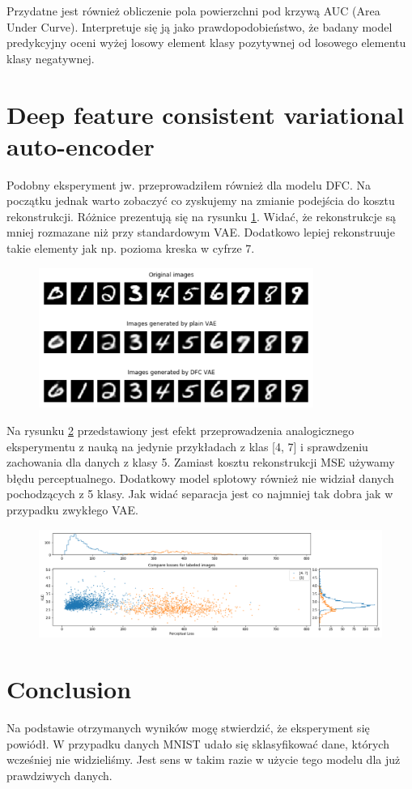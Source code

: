Przydatne jest również obliczenie pola powierzchni pod krzywą AUC (Area Under Curve). Interpretuje się ją jako prawdopodobieństwo, że badany model predykcyjny oceni wyżej losowy element klasy pozytywnej od losowego elementu klasy negatywnej.

\section{Deep feature consistent variational auto-encoder}

Podobny eksperyment jw. przeprowadziłem również dla modelu DFC. Na początku jednak warto zobaczyć co zyskujemy na zmianie podejścia do kosztu rekonstrukcji. Różnice prezentują się na rysunku \ref{fig:vae_dfc_recon}. Widać, że rekonstrukcje są mniej rozmazane niż przy standardowym VAE. Dodatkowo lepiej rekonstruuje takie elementy jak np. pozioma kreska w cyfrze 7. 

\begin{figure}[h!]
    \centering
    \includegraphics[width=0.8\textwidth]{images/vae_dfc_gen}
    \caption{}
    \label{fig:vae_dfc_recon}
\end{figure}

Na rysunku \ref{fig:dfc_mnist_compare} przedstawiony jest efekt przeprowadzenia analogicznego eksperymentu z nauką na jedynie przykładach z klas [4, 7] i sprawdzeniu zachowania dla danych z klasy 5. Zamiast kosztu rekonstrukcji MSE używamy błędu perceptualnego. Dodatkowy model splotowy również nie widział danych pochodzących z 5 klasy. Jak widać separacja jest co najmniej tak dobra jak w przypadku zwykłego VAE.

\begin{figure}[h!]
    \centering
    \includegraphics[width=1.0\textwidth]{images/dfc_mnist_compare}
    \caption{}
    \label{fig:dfc_mnist_compare}
\end{figure}

\section{Conclusion}

Na podstawie otrzymanych wyników mogę stwierdzić, że eksperyment się powiódł. W przypadku danych MNIST udało się sklasyfikować dane, których wcześniej nie widzieliśmy. Jest sens w takim razie w użycie tego modelu dla już prawdziwych danych.
